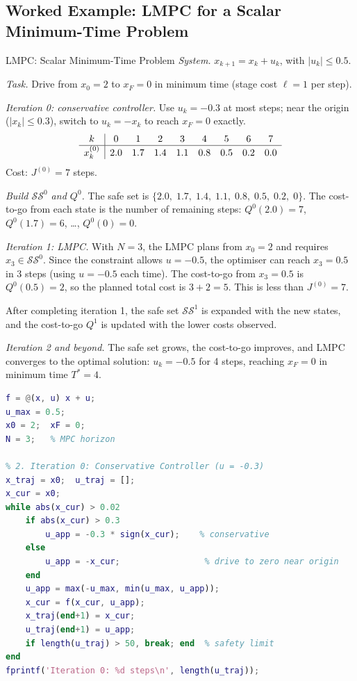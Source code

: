 \subsection{Worked Example: LMPC for a Scalar Minimum-Time Problem}
\label{sec:lmpc_example}

\begin{examplebox}{LMPC: Scalar Minimum-Time Problem}
	\emph{System.} $x_{k+1} = x_k + u_k$, with $|u_k| \le 0.5$.

	\emph{Task.} Drive from $x_0 = 2$ to $x_F = 0$ in minimum time (stage cost $\ell = 1$ per step).

	\emph{Iteration 0: conservative controller.} Use $u_k = -0.3$ at most steps; near the origin ($|x_k| \le 0.3$), switch to $u_k = -x_k$ to reach $x_F = 0$ exactly.
	\[
	\begin{array}{c|c c c c c c c c}
		k & 0 & 1 & 2 & 3 & 4 & 5 & 6 & 7 \\
		\hline
		x_k^{(0)} & 2.0 & 1.7 & 1.4 & 1.1 & 0.8 & 0.5 & 0.2 & 0.0
	\end{array}
	\]
	Cost: $J^{(0)} = 7$ steps.

	\solution

	\emph{Build $\mathcal{SS}^0$ and $Q^0$.} The safe set is $\{2.0,\; 1.7,\; 1.4,\; 1.1,\; 0.8,\; 0.5,\; 0.2,\; 0\}$. The cost-to-go from each state is the number of remaining steps: $Q^0(2.0) = 7$, $Q^0(1.7) = 6$, \ldots, $Q^0(0) = 0$.

	\emph{Iteration 1: LMPC.} With $N = 3$, the LMPC plans from $x_0 = 2$ and requires $x_3 \in \mathcal{SS}^0$. Since the constraint allows $u = -0.5$, the optimiser can reach $x_3 = 0.5$ in 3 steps (using $u = -0.5$ each time). The cost-to-go from $x_3 = 0.5$ is $Q^0(0.5) = 2$, so the planned total cost is $3 + 2 = 5$. This is less than $J^{(0)} = 7$.

	After completing iteration 1, the safe set $\mathcal{SS}^1$ is expanded with the new states, and the cost-to-go $Q^1$ is updated with the lower costs observed.

	\emph{Iteration 2 and beyond.} The safe set grows, the cost-to-go improves, and LMPC converges to the optimal solution: $u_k = -0.5$ for 4 steps, reaching $x_F = 0$ in minimum time $T^* = 4$.

\begin{lstlisting}[language=Matlab, caption={LMPC for scalar minimum-time regulation.}]
% 1. System and Constraints
f = @(x, u) x + u;
u_max = 0.5;
x0 = 2;  xF = 0;
N = 3;   % MPC horizon

% 2. Iteration 0: Conservative Controller (u = -0.3)
x_traj = x0;  u_traj = [];
x_cur = x0;
while abs(x_cur) > 0.02
    if abs(x_cur) > 0.3
        u_app = -0.3 * sign(x_cur);    % conservative
    else
        u_app = -x_cur;                 % drive to zero near origin
    end
    u_app = max(-u_max, min(u_max, u_app));
    x_cur = f(x_cur, u_app);
    x_traj(end+1) = x_cur;
    u_traj(end+1) = u_app;
    if length(u_traj) > 50, break; end  % safety limit
end
fprintf('Iteration 0: %d steps\n', length(u_traj));


\end{lstlisting}
\end{examplebox}
